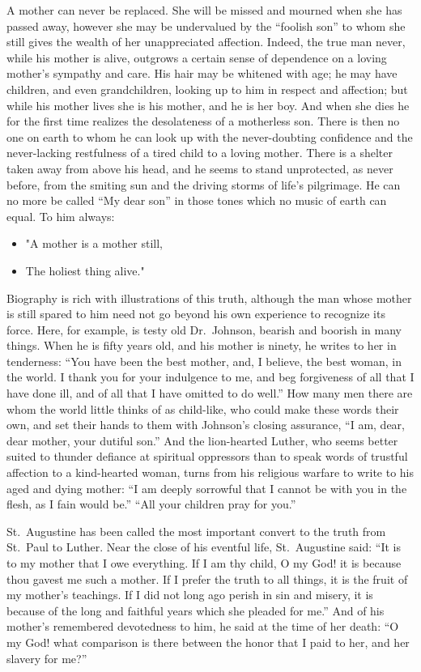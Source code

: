 \documentclass[
]{book}
\providecommand{\tightlist}{%
  \setlength{\itemsep}{0pt}\setlength{\parskip}{0pt}}
\begin{document}
A mother can never be replaced. She will be missed and mourned when she has passed away, however she may be undervalued by the ``foolish son'' to whom she still gives the wealth of her unappreciated affection. Indeed, the true man never, while his mother is alive, outgrows a certain sense of dependence on a loving mother's sympathy and care. His hair may be whitened with age; he may have children, and even grandchildren, looking up to him in respect and affection; but while his mother lives she is his mother, and he is her boy. And when she dies he for the first time realizes the desolateness of a motherless son. There is then no one on earth to whom he can look up with the never-doubting confidence and the never-lacking restfulness of a tired child to a loving mother. There is a shelter taken away from above his head, and he seems to stand unprotected, as never before, from the smiting sun and the driving storms of life's pilgrimage. He can no more be called ``My dear son'' in those tones which no music of earth can equal. To him always:

\begin{itemize}
\tightlist
\item
  "A mother is a mother still,
\item
  The holiest thing alive."
\end{itemize}

Biography is rich with illustrations of this truth, although the man whose mother is still spared to him need not go beyond his own experience to recognize its force. Here, for example, is testy old Dr.~Johnson, bearish and boorish in many things. When he is fifty years old, and his mother is ninety, he writes to her in tenderness: ``You have been the best mother, and, I believe, the best woman, in the world. I thank you for your indulgence to me, and beg forgiveness of all that I have done ill, and of all that I have omitted to do well.'' How many men there are whom the world little thinks of as child-like, who could make these words their own, and set their hands to them with Johnson's closing assurance, ``I am, dear, dear mother, your dutiful son.'' And the lion-hearted Luther, who seems better suited to thunder defiance at spiritual oppressors than to speak words of trustful affection to a kind-hearted woman, turns from his religious warfare to write to his aged and dying mother: ``I am deeply sorrowful that I cannot be with you in the flesh, as I fain would be.'' ``All your children pray for you.''

St.~Augustine has been called the most important convert to the truth from St.~Paul to Luther. Near the close of his eventful life, St.~Augustine said: ``It is to my mother that I owe everything. If I am thy child, O my God! it is because thou gavest me such a mother. If I prefer the truth to all things, it is the fruit of my mother's teachings. If I did not long ago perish in sin and misery, it is because of the long and faithful years which she pleaded for me.'' And of his mother's remembered devotedness to him, he said at the time of her death: ``O my God! what comparison is there between the honor that I paid to her, and her slavery for me?''
\end{document}
